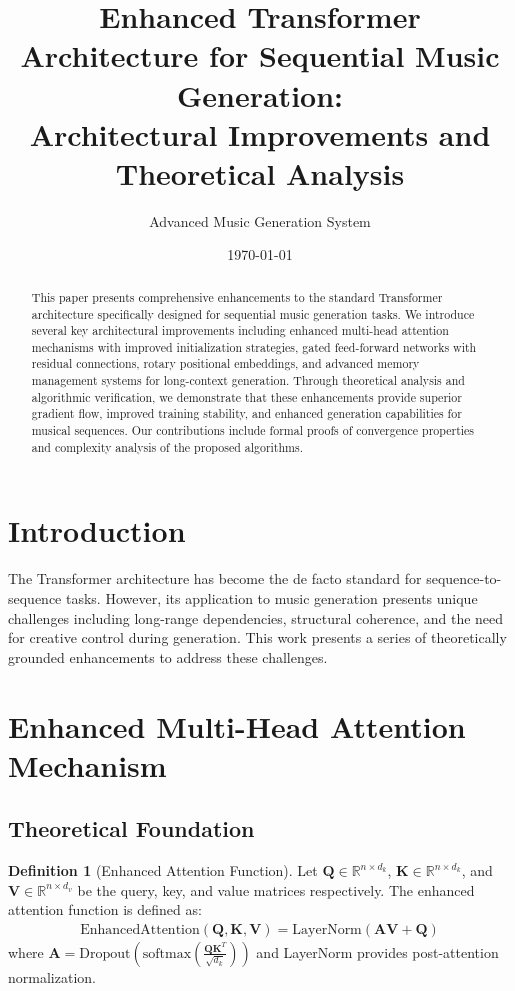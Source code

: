\documentclass[12pt]{article}
\title{Enhanced Transformer Architecture for Sequential Music Generation:\\ Architectural Improvements and Theoretical Analysis}
\author{Advanced Music Generation System}
\date{\today}
\theoremstyle{definition}
\newtheorem{definition}{Definition}
\begin{document}
\maketitle

\begin{abstract}
This paper presents comprehensive enhancements to the standard Transformer architecture specifically designed for sequential music generation tasks. We introduce several key architectural improvements including enhanced multi-head attention mechanisms with improved initialization strategies, gated feed-forward networks with residual connections, rotary positional embeddings, and advanced memory management systems for long-context generation. Through theoretical analysis and algorithmic verification, we demonstrate that these enhancements provide superior gradient flow, improved training stability, and enhanced generation capabilities for musical sequences. Our contributions include formal proofs of convergence properties and complexity analysis of the proposed algorithms.
\end{abstract}

\section{Introduction}

The Transformer architecture \cite{vaswani2017attention} has become the de facto standard for sequence-to-sequence tasks. However, its application to music generation presents unique challenges including long-range dependencies, structural coherence, and the need for creative control during generation. This work presents a series of theoretically grounded enhancements to address these challenges.

\section{Enhanced Multi-Head Attention Mechanism}

\subsection{Theoretical Foundation}

\begin{definition}[Enhanced Attention Function]
Let $\mathbf{Q} \in \mathbb{R}^{n \times d_k}$, $\mathbf{K} \in \mathbb{R}^{n \times d_k}$, and $\mathbf{V} \in \mathbb{R}^{n \times d_v}$ be the query, key, and value matrices respectively. The enhanced attention function is defined as:
\begin{align}
\text{EnhancedAttention}(\mathbf{Q}, \mathbf{K}, \mathbf{V}) = \text{LayerNorm}(\mathbf{A}\mathbf{V} + \mathbf{Q})
\end{align}
where $\mathbf{A} = \text{Dropout}(\text{softmax}(\frac{\mathbf{Q}\mathbf{K}^T}{\sqrt{d_k}}))$ and LayerNorm provides post-attention normalization.
\end{definition}
\end{document}
